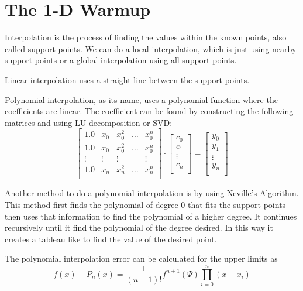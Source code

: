\section{The 1-D Warmup}

Interpolation is the process of finding the values within the known points, also called support points. We can do a local interpolation, which is just using nearby support points or a global interpolation using all support points. 

Linear interpolation uses a straight line between the support points.

Polynomial interpolation, as its name, uses a polynomial function where the coefficients are linear. The coefficient can be found by constructing the following matrices and using LU decomposition or SVD:
\begin{equation}
    \begin{bmatrix}
        1.0 &   x_0 &   x_0^2 & \dots &x_0^n\\
        1.0 &   x_0 &   x_0^2 & \dots &x_0^n\\
        \vdots& \vdots& \vdots&         &\vdots\\
        1.0 &   x_n &   x_n^2 & \dots &x_n^n\\
    \end{bmatrix}
    \cdot
    \begin{bmatrix}
        c_0   \\
        c_1   \\
        \vdots   \\
        c_n   \\
    \end{bmatrix}
    =
    \begin{bmatrix}
        y_0  \\
        y_1 \\
        \vdots \\
        y_n \\
    \end{bmatrix}
\end{equation}

Another method to do a polynomial interpolation is by using Neville's Algorithm. This method first finds the polynomial of degree 0 that fits the support points then uses that information to find the polynomial of a higher degree. It continues recursively until it find the polynomial of the degree desired. In this way it creates a tableau like to find the value of the desired point. 

The polynomial interpolation error can be calculated for the upper limits as
\begin{equation}
    f(x)-P_n(x) = \frac{1}{(n+1)!}f^{n+1}(\Psi)\prod^n_{i=0}(x-x_i)
    \label{eq:polyError}
\end{equation}

